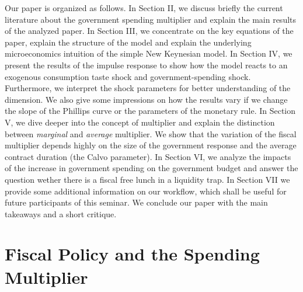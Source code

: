 \documentclass[12pt,a4paper,oneside,titlepage]{article}
\begin{document}
Our paper is organized as follows. In Section II, we discuss briefly the current literature about the government spending multiplier and explain the main results of the analyzed paper. In Section III, we concentrate on the key equations of the paper, explain the structure of the model and explain the underlying microeconomics intuition of the simple New Keynesian model. In Section IV, we present the results of the impulse response to show how the model reacts to an exogenous consumption taste shock and government-spending shock. Furthermore, we interpret the shock parameters for better understanding of the dimension. We also give some impressions on how the results vary if we change the slope of the Phillips curve or the parameters of the monetary rule. In Section V, we dive deeper into the concept of multiplier and explain the distinction between \textit{marginal} and \textit{average} multiplier. We show that the variation of the fiscal multiplier depends highly on the size of the government response and the average contract duration (the Calvo parameter). In Section VI, we analyze the impacts of the increase in government spending on the government budget and answer the question wether there is a fiscal free lunch in a liquidity trap. In Section VII we provide some additional information on our workflow, which shall be useful for future participants of this seminar. We conclude our paper with the main takeaways and a short critique.


\section{Fiscal Policy and the Spending Multiplier }
\end{document}
